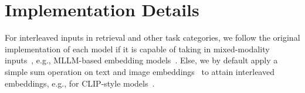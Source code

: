 \section{Implementation Details}
\label{sec:imp}

For interleaved inputs in retrieval and other task categories, we follow the original implementation of each model if it is capable of taking in mixed-modality inputs~\citep{zhou2024vista}, e.g., MLLM-based embedding models~\citep{jiang2024e5,jiang2024vlm2vec}. Else, we by default apply a simple sum operation on text and image embeddings~\citep{wei2023uniir} to attain interleaved embeddings, e.g., for CLIP-style models~\citep{radford2021learning,zhai2023sigmoid,gadre2024datacomp,sun2023eva}.